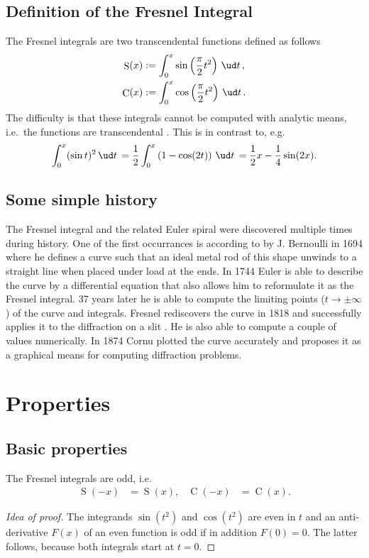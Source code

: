 \documentclass[12pt]{article}
\DeclareMathOperator\Cee{C} %
\def\d#1{{\,\ud#1\,}}
\DeclareMathOperator\eS{S} %
\begin{document}
\subsection{Definition of the Fresnel Integral}
The Fresnel integrals are two transcendental functions defined as follows
\begin{align}
  \eS(x) &:= \int_0^x  \sin\left(\frac\pi2 t^2\right) \d{t}, \\
  \Cee(x) &:= \int_0^x \cos\left(\frac\pi2 t^2\right) \d{t}.
\end{align}
The difficulty is that these integrals cannot be computed with analytic means, i.e.~the functions are transcendental \cite[p.195ff]{AS}.  This is in contrast to, e.g.
$$ \int_0^x (\sin t)^2 \d{t} = \frac12\int_0^x \left(1-\cos(2t)\right)\d{t} = \frac12x -\frac14\sin(2x).
$$

\subsection{Some simple history}
The Fresnel integral and the related Euler spiral were discovered multiple times during history.  One of the first occurrances is according to \cite{Lev08} by J. Bernoulli in 1694 where he defines a curve such that an ideal metal rod of this shape unwinds to a straight line when placed under load at the ends.  In 1744 Euler is able to describe the curve by a differential equation that also allows him to reformulate it as the Fresnel integral.  37 years later he is able to compute the limiting points ($t\to\pm\infty$) of the curve and integrals.  Fresnel rediscovers the curve in 1818 and successfully applies it to the diffraction on a slit \cite{Lev08}.  He is also able to compute a couple of values numerically.  In 1874 Cornu plotted the curve accurately and proposes it as a graphical means for computing diffraction problems.


\section{Properties}
\subsection{Basic properties}
The Fresnel integrals are odd, i.e.
\begin{align*}
	\eS(-x) &= \eS(x), & \Cee(-x) &= \Cee(x).
\end{align*}
\begin{proof}[Idea of proof]  The integrands $\sin(t^2)$ and $\cos(t^2)$ are even in $t$ and an anti-derivative $F(x)$ of an even function is odd if in addition $F(0)=0$.  The latter follows, because both integrals start at $t=0$.
\end{proof}
\end{document}
